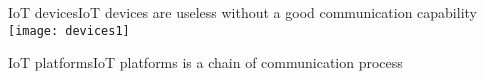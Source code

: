 

\begin{frame}{IoT devices}{IoT devices are useless without a good communication capability}
	\centering
	\texttt{[image: devices1]}
\end{frame}


\begin{frame}{IoT platforms}{IoT platforms is a chain of communication process}
\end{frame}


